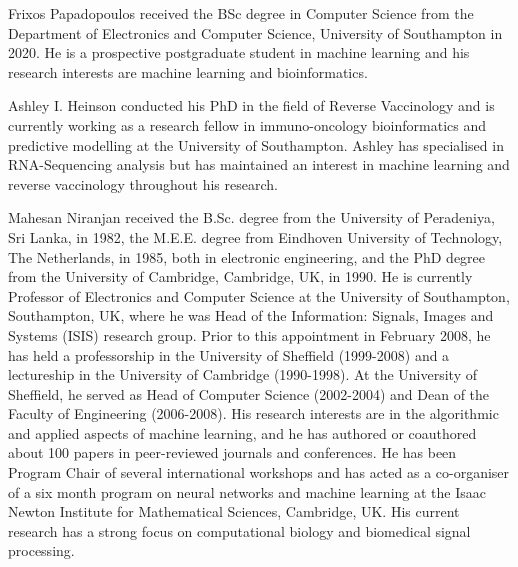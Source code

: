 \documentclass[10pt,journal,compsoc,twoside]{IEEEtran}
\begin{document}
\begin{IEEEbiography}{Frixos Papadopoulos} received the BSc degree in Computer Science from the Department of Electronics and Computer Science, University of Southampton in 2020. He is a prospective postgraduate student in machine learning and his research interests are machine learning and bioinformatics.
\end{IEEEbiography}
\begin{IEEEbiography}{Ashley I. Heinson} conducted his PhD in the field of Reverse Vaccinology and is currently working as a research fellow in immuno-oncology bioinformatics and predictive modelling at the University of Southampton. Ashley has specialised in RNA-Sequencing analysis but has maintained an interest in machine learning and reverse vaccinology throughout his research.
\end{IEEEbiography}
\begin{IEEEbiography}{Mahesan Niranjan}
received the B.Sc. degree from the University of Peradeniya, Sri Lanka, in 1982, the M.E.E. degree from Eindhoven University of Technology, The Netherlands, in 1985, both in electronic engineering, and the PhD degree from the University of Cambridge, Cambridge, UK, in 1990. He is currently Professor of Electronics and Computer Science at the University of Southampton, Southampton, UK, where he was Head of the Information: Signals, Images and Systems (ISIS) research group. Prior to this appointment in February 2008, he has held a professorship in the University of Sheffield (1999-2008) and a lectureship in the University of Cambridge (1990-1998). At the University of Sheffield, he served as Head of Computer Science (2002-2004) and Dean of the Faculty of Engineering (2006-2008). His research interests are in the algorithmic and applied aspects of machine learning, and he has authored or coauthored about 100 papers in peer-reviewed journals and conferences. He has been Program Chair of several international workshops and has acted as a co-organiser of a six month program on neural networks and machine learning at the Isaac Newton Institute for Mathematical Sciences, Cambridge, UK. His current research has a strong focus on computational biology and biomedical signal processing.
\end{IEEEbiography}




\end{document}
